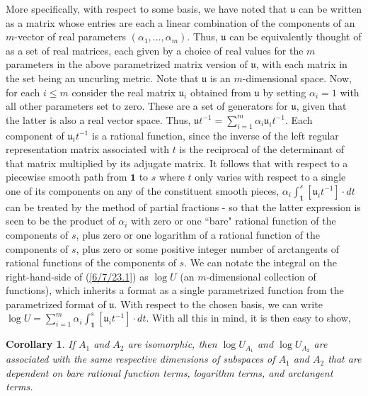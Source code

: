 \documentclass{amsart}
\numberwithin{equation}{section}
\newtheorem{corollary}[theorem]{Corollary}
\theoremstyle{definition}
\numberwithin{theorem}{section}
\begin{document}
More specifically, with respect to some basis, we have noted that $\mathfrak{u}$ can be written as a matrix whose entries are each a linear combination of the components of an $m$-vector of real parameters $(\alpha_1, \dots, \alpha_m)$.   Thus, $\mathfrak{u}$ can be equivalently thought of as a set of real matrices, each given by a choice of real values for the $m$ parameters in the above parametrized matrix version of $\mathfrak{u}$, with each matrix in the set being an uncurling metric.   Note that $\mathfrak{u}$ is an $m$-dimensional space.    Now, for each $i\le m$ consider the real matrix  $\mathfrak{u}_i$ obtained from $\mathfrak{u}$ by setting $\alpha_i =1$ with all other parameters set to zero.  These are a set of generators for $\mathfrak{u}$, given that the latter is also a real vector space. Thus, $\mathfrak{u}t^{-1} = \sum_{i=1}^m \alpha_i \mathfrak{u}_i t^{-1}$.   Each component of $\mathfrak{u}_i t^{-1}$ is a rational function, since the inverse of the left regular representation matrix associated with $t$ is the reciprocal of the determinant of that matrix multiplied by its adjugate matrix.  It follows that  with respect to a piecewise smooth path from $\mathbf{1}$ to $s$ where $t$ only varies with respect to a single one of its components on any of the constituent smooth pieces, $\alpha_i \int_{\mathbf{1}}^s [\mathfrak{u}_i t^{-1}]\cdot dt$ can be treated by the method of partial fractions - so that the latter expression is seen to be the product of $\alpha_i$ with zero or one ``bare" rational function of the components of $s$, plus zero or one logarithm of a rational function of the components of $s$, plus zero or some positive integer number of arctangents of rational functions of the components of $s$.  We can notate the integral on the right-hand-side of (\ref{6/7/23.1}) as $\log  U$ (an $m$-dimensional collection of functions), which inherits a format as a single parametrized function from the parametrized format of $\mathfrak{u}$.  With respect to the chosen basis, we can write $\log  U =\sum_{i=1}^m \alpha_i \int_{\mathbf{1}}^s [\mathfrak{u}_i t^{-1}]\cdot dt$.  With all this in mind, it is then easy to show,

\begin{corollary} \label{6/6/23.3} If $A_1$ and $A_2$ are isomorphic, then $\log U_{A_1}$ and $\log U_{A_2}$ are associated with the same respective dimensions of subspaces of $A_1$ and $A_2$ that are dependent on bare rational function terms, logarithm terms, and arctangent terms.
\end{corollary}
\end{document}

